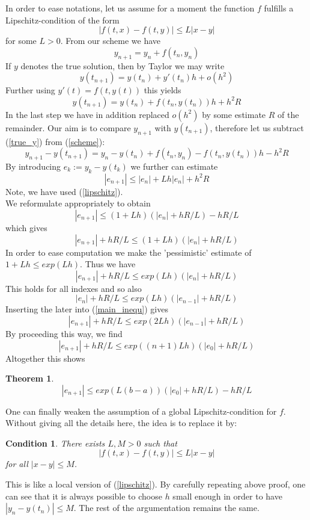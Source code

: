 \documentclass[17pt]{extarticle}
\newtheorem*{theorem*}{Theorem}
\newtheorem*{condition*}{Condition}
\begin{document}
In order to ease notations, let us assume for a moment the function $f$ fulfills a Lipschitz-condition of the form
\begin{equation} \label{lipschitz}
|f(t, x)-f(t,y)|\leq L|x-y|
\end{equation}
for some $L>0$.
From our scheme we have
\begin{equation} \label{scheme}
	y_{n+1}=y_n+f(t_n, y_n)
\end{equation}
If $y$ denotes the true solution, then by Taylor we may write
\begin{equation*} 
	y(t_{n+1})=y(t_n)+y'(t_n)h+o(h^2)
\end{equation*}
Further using $y'(t)=f(t,y(t))$ this yields
\begin{equation} \label{true_y}
	y(t_{n+1})=y(t_n)+f(t_n, y(t_n))h+h^2R
\end{equation}
In the last step we have in addition replaced $o(h^2)$ by some estimate $R$ of the remainder.
Our aim is to compare $y_{n+1}$ with $y(t_{n+1})$, therefore let us subtract (\ref{true_y}) from (\ref{scheme}):
$$
y_{n+1}-y(t_{n+1})=y_n-y(t_n)+f(t_n, y_n)-f(t_n, y(t_n))h-h^2R
$$
By introducing $e_k:=y_{k}-y(t_k)$ we further can estimate
$$
|e_{n+1}|\leq |e_n|+Lh|e_n|+h^2R
$$
Note, we have used (\ref{lipschitz}).\\
 We reformulate appropriately to obtain
$$
|e_{n+1}|\leq (1+Lh)(|e_n|+hR/L)-hR/L
$$
which gives
$$
|e_{n+1}|+hR/L\leq (1+Lh)(|e_n|+hR/L)
$$
In order to ease computation we make the 'pessimistic' estimate of $1+Lh\leq exp(Lh)$.
Thus we have
\begin{equation} \label{main_inequ}
|e_{n+1}|+hR/L\leq exp(Lh)(|e_n|+hR/L)
\end{equation}
This holds for all indexes and so also
$$
|e_{n}|+hR/L\leq exp(Lh)(|e_{n-1}|+hR/L)
$$
Inserting the later into (\ref{main_inequ}) gives
$$
|e_{n+1}|+hR/L\leq exp(2Lh)(|e_{n-1}|+hR/L)
$$
By proceeding this way, we find
$$
|e_{n+1}|+hR/L\leq exp((n+1)Lh)(|e_{0}|+hR/L)
$$
Altogether this shows
\begin{theorem*}
$$
|e_{n+1}|\leq exp(L(b-a))(|e_{0}|+hR/L)-hR/L
$$
\end{theorem*}
One can finally weaken the assumption of a global Lipschitz-condition for $f$. Without giving all the details here, the idea is to replace it by:
\begin{condition*}
There exists $L, M>0$ such that
\begin{equation*} 
	|f(t, x)-f(t,y)|\leq L|x-y|
\end{equation*}
for all $|x-y|\leq M$.
\end{condition*}
This is like a local version of (\ref{lipschitz}). By carefully repeating above proof, one can see that  it is always possible to choose $h$ small enough in order to have $|y_n-y(t_n)|\leq M$. The rest of the argumentation remains the same.
\end{document}
